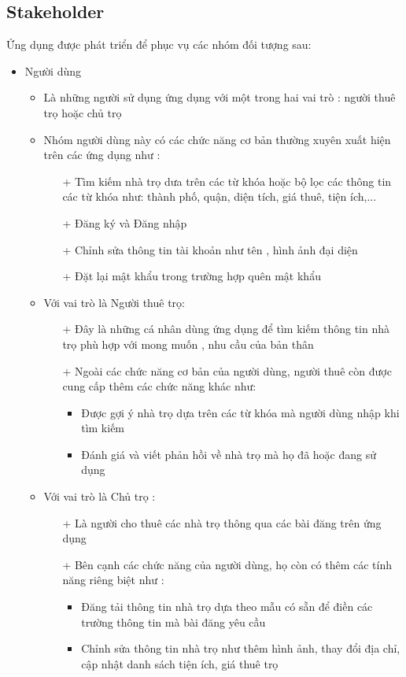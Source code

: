 \subsection{Stakeholder}
Ứng dụng được phát triển để phục vụ các nhóm đối tượng sau:
\begin{itemize}
    \item Người dùng
    \begin{itemize}
        \item Là những người sử dụng ứng dụng với một trong hai vai trò : người thuê trọ hoặc chủ trọ
        \item Nhóm người dùng này có các chức năng cơ bản thường xuyên xuất hiện trên các ứng dụng như :
        \begin{itemize}
            \item[+] Tìm kiếm nhà trọ dưa trên các từ khóa hoặc bộ lọc các thông tin các từ khóa như: thành phố, quận, diện tích, giá thuê, tiện ích,...
            \item[+] Đăng ký và Đăng nhập
            \item[+] Chỉnh sửa thông tin tài khoản như tên , hình ảnh đại diện
            \item[+] Đặt lại mật khẩu trong trường hợp quên mật khẩu
        \end{itemize}
        \item Với vai trò là Người thuê trọ:
        \begin{itemize}
            \item[+] Đây là những cá nhân dùng ứng dụng để tìm kiếm thông tin nhà trọ phù hợp với mong muốn , nhu cầu của bản thân
            \item[+] Ngoài các chức năng cơ bản của người dùng, người thuê còn được cung cấp thêm các chức năng khác như:
            \begin{itemize}
                \item Được gợi ý nhà trọ dựa trên các từ khóa mà người dùng nhập khi tìm kiếm
                \item Đánh giá và viết phản hồi về nhà trọ mà họ đã hoặc đang sử dụng
            \end{itemize}
        \end{itemize}
        \item Với vai trò là Chủ trọ :
        \begin{itemize}
            \item[+] Là người cho thuê các nhà trọ thông qua các bài đăng trên ứng dụng
            \item[+] Bên cạnh các chức năng của người dùng, họ còn có thêm các tính năng riêng biệt như : 
             \begin{itemize}
                \item Đăng tải thông tin nhà trọ dựa theo mẫu có sẵn để điền các trường thông tin mà bài đăng yêu cầu
                \item Chỉnh sửa thông tin nhà trọ như thêm hình ảnh, thay đổi địa chỉ, cập nhật danh sách tiện ích, giá thuê trọ
            \end{itemize}
        \end{itemize}
    \end{itemize}
\end{itemize}
